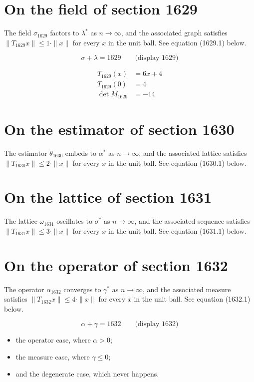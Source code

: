 \documentclass{article}
\begin{document}
\section{On the field of section 1629}
The field $\sigma_{1629}$ factors to $\lambda^{*}$ as $n \to \infty$,
and the associated graph satisfies $\|T_{1629} x\| \leq 1 \cdot \|x\|$
for every $x$ in the unit ball. See equation (1629.1) below.

$$
\sigma + \lambda = 1629 \qquad \text{(display 1629)}
$$

\begin{align}
T_{1629}(x) &= 6 x + 4 \\
T_{1629}(0) &= 4 \\
\det M_{1629} &= -14
\end{align}

\section{On the estimator of section 1630}
The estimator $\theta_{1630}$ embeds to $\alpha^{*}$ as $n \to \infty$,
and the associated lattice satisfies $\|T_{1630} x\| \leq 2 \cdot \|x\|$
for every $x$ in the unit ball. See equation (1630.1) below.

\section{On the lattice of section 1631}
The lattice $\omega_{1631}$ oscillates to $\sigma^{*}$ as $n \to \infty$,
and the associated sequence satisfies $\|T_{1631} x\| \leq 3 \cdot \|x\|$
for every $x$ in the unit ball. See equation (1631.1) below.

\section{On the operator of section 1632}
The operator $\alpha_{1632}$ converges to $\gamma^{*}$ as $n \to \infty$,
and the associated measure satisfies $\|T_{1632} x\| \leq 4 \cdot \|x\|$
for every $x$ in the unit ball. See equation (1632.1) below.

$$
\alpha + \gamma = 1632 \qquad \text{(display 1632)}
$$

\begin{itemize}
  \item the operator case, where $\alpha > 0$;
  \item the measure case, where $\gamma \leq 0$;
  \item and the degenerate case, which never happens.
\end{itemize}
\end{document}
